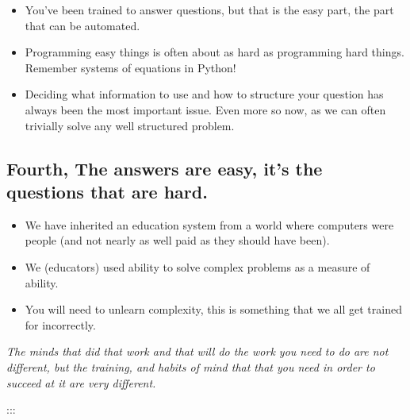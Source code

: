 \begin{itemize}
\tightlist
\item
  You've been trained to answer questions, but that is the easy part,
  the part that can be automated.
\item
  Programming easy things is often about as hard as programming hard
  things. Remember systems of equations in Python!
\item
  Deciding what information to use and how to structure your question
  has always been the most important issue. Even more so now, as we can
  often trivially solve any well structured problem.
\end{itemize}

\hypertarget{fourth-the-answers-are-easy-its-the-questions-that-are-hard.-1}{%
\subsection{Fourth, The answers are easy, it's the questions that are
hard.}\label{fourth-the-answers-are-easy-its-the-questions-that-are-hard.-1}}

\begin{itemize}
\tightlist
\item
  We have inherited an education system from a world where computers
  were people (and not nearly as well paid as they should have been).
\item
  We (educators) used ability to solve complex problems as a measure of
  ability.
\item
  You will need to unlearn complexity, this is something that we all get
  trained for incorrectly.
\end{itemize}

\emph{The minds that did that work and that will do the work you need to
do are not different, but the training, and habits of mind that that you
need in order to succeed at it are very different.}

:::
